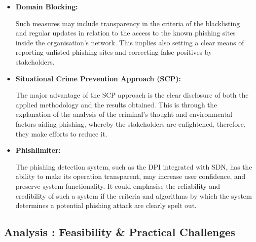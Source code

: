 \begin{itemize}
    \item \textbf{Domain Blocking:} 

    Such measures may include transparency in the criteria of the blacklisting and regular updates in relation to the access to the known phishing sites inside the organisation's network. This implies also setting a clear means of reporting unlisted phishing sites and correcting false positives by stakeholders. 

    \item \textbf{Situational Crime Prevention Approach (SCP):}

    The major advantage of the SCP approach is the clear disclosure of both the applied methodology and the results obtained. This is through the explanation of the analysis of the criminal's thought and environmental factors aiding phishing, whereby the stakeholders are enlightened, therefore, they make efforts to reduce it. 

    \item \textbf{Phishlimiter:}

    The phishing detection system, such as the DPI integrated with SDN, has the ability to make its operation transparent, may increase user confidence, and preserve system functionality. It could emphasise the reliability and credibility of such a system if the criteria and algorithms by which the system determines a potential phishing attack are clearly spelt out. 

\end{itemize}

\subsection{ Analysis : Feasibility \& Practical Challenges }

